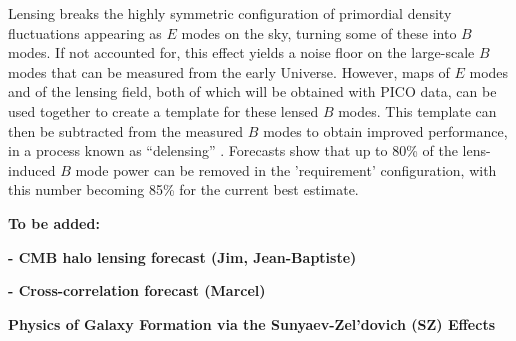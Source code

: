 \documentclass[PICOReport.tex]{subfiles}
\begin{document}
Lensing breaks the highly symmetric configuration of primordial density fluctuations appearing as $E$ modes on the sky, turning some of these into $B$ modes.  If not accounted for, this effect yields a noise floor on the large-scale $B$ modes that can be measured from the early Universe.  However, maps of $E$ modes and of the lensing field, both of which will be obtained with PICO data, can be used together to create a template for these lensed $B$ modes.  This template can then be subtracted from the measured $B$ modes to obtain improved performance, in a process known as ``delensing'' \citep{2004PhRvD..69d3005S,2012JCAP...06..014S}.  Forecasts show that up to 80\% of the lens-induced $B$ mode power can be removed in the 'requirement' configuration, with this number becoming 85\% for the current best estimate.  

\textbf{To be added:}

\textbf{- CMB halo lensing forecast (Jim, Jean-Baptiste)}

\textbf{- Cross-correlation forecast (Marcel)}


{\bf Physics of Galaxy Formation via the Sunyaev-Zel'dovich (SZ) Effects}
\end{document}
